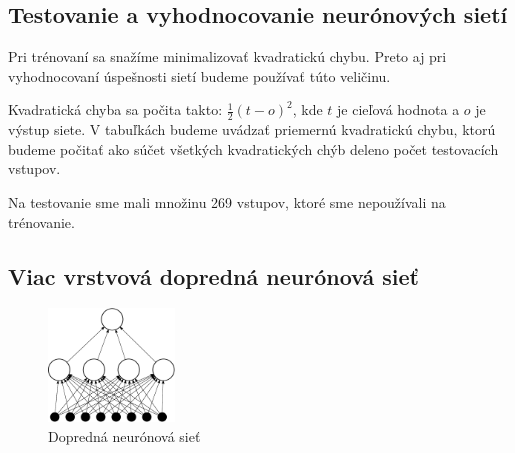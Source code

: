 
\subsection{Testovanie a vyhodnocovanie neurónových sietí}
Pri trénovaní sa snažíme minimalizovať kvadratickú chybu. Preto aj pri vyhodnocovaní úspešnosti sietí budeme používať túto veličinu.

Kvadratická chyba sa počita takto: $\frac{1}{2}(t-o)^2$, kde $t$ je cieľová hodnota a $o$ je výstup siete. V tabuľkách budeme uvádzať priemernú kvadratickú chybu, ktorú budeme počitať ako súčet všetkých kvadratických chýb deleno počet testovacích vstupov. 

Na testovanie sme mali množinu 269 vstupov, ktoré sme nepoužívali na trénovanie.







\subsection{Viac vrstvová dopredná neurónová sieť}

\begin{figure}[hp]
  \begin{center}
    \includegraphics[width=0.3\textwidth]{images/ffnn}
  \end{center}
  \caption{Dopredná neurónová sieť}
  \label{fig:ffnn}
\end{figure}

